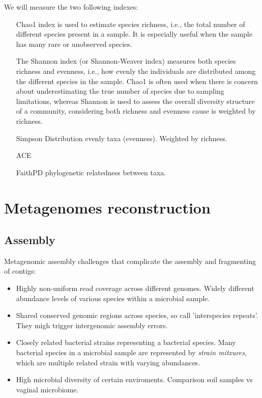 We will measure the two following indexes:
\begin{itemize}
    \item[Chao1 index] is used to estimate species richness, i.e., the total number of different species present in a 
    sample. It is especially useful when the sample has many rare or unobserved species.
    \item[The Shannon index (or Shannon-Weaver index)] measures both species richness and evenness, i.e., how evenly the 
    individuals are distributed among the different species in the sample. Chao1 is often used when there is concern about 
    underestimating the true number of species due to sampling limitations, whereas Shannon is used to assess the overall 
    diversity structure of a community, considering both richness and evenness cause is weighted by richness.
    \item[Simpson] Distribution evenly taxa (evenness). Weighted by richness.
    \item[ACE]
    \item[FaithPD] phylogenetic relatedness between taxa.
\end{itemize}


\section{Metagenomes reconstruction}
\subsection{Assembly}

Metagenomic assembly challenges that complicate the assembly and fragmenting of contigs:
\begin{itemize}
    \item Highly non-uniform read coverage across different genomes. Widely different abundance levels of various species 
        within a microbial sample.
    \item Shared conserved genomic regions across species, so call 'interspecies repeats'. They migh trigger intergenomic 
        assembly errors.
    \item Closely related bacterial strains representing a bacterial species. Many bacterial species in a microbial sample 
        are represented by \textit{strain mitxures}, which are multiple related strain with varying abundances.
    \item High microbial diversity of certain enviroments. Comparison soil samples vs vaginal microbiome.
\end{itemize}

